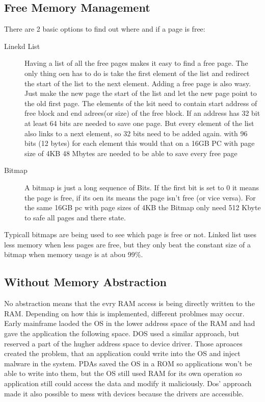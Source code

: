 \documentclass[a4paper]{scrartcl}
\begin{document}
            \subsection{Free Memory Management}
                There are 2 basic options to find out where and if a page is free:
                \begin{description}
                    \item[Linekd List] Having a list of all the free pages makes it easy to find a free page. The only thing oen has to do is take the first element
                        of the list and redirect the start of the list to the next element. Adding a free page is also wasy. Just make the new page the start of the list
                        and let the new page point to the old first page. The elements of the lsit need to contain start address of free block and end adrees(or size) of the free block.
                        If an address has 32 bit at least 64 bits are needed to save one page. But every element of the list also links to a next element, so 32 bits need to be added again. 
                        with 96 bits (12 bytes) for each element this would that on a 16GB PC with page size of 4KB 48 Mbytes are needed to be able to save every free page 
                    \item[Bitmap] 
                        A bitmap is just a long sequence of Bits. If the first bit is set to 0 it means the page is free, if its oen its means the page isn't free (or vice versa).
                        For the same 16GB pc with page sizes of 4KB the Bitmap only need 512 Kbyte to safe all pages and there state.
                \end{description}                    
                Typicall bitmaps are being used to see which page is free or not. Linked list uses less memory when less pages are free, but they only beat the constant 
                size of a bitmap when memory usage is at abou 99\%.
            \subsection{Without Memory Abstraction}
                No abstraction means that the evry RAM access is being directly written to the RAM. Depending on how this is implemented, different problmes may occur.
                Early mainframe laoded the OS in the lower address space of the RAM and had gave the application the following space. DOS used a similar approach, but reserved
                a part of the hugher address space to device driver. Those aproaces created the problem, that an application could write into the OS and inject malware in the system.
                PDAs saved the OS in  a ROM so applications won't be able to write into them, but the OS still used RAM for its own operation so application still could access
                the data and modify it maliciously. Dos' approach made it also possible to mess with devices because the drivers are accessible.
\end{document}
